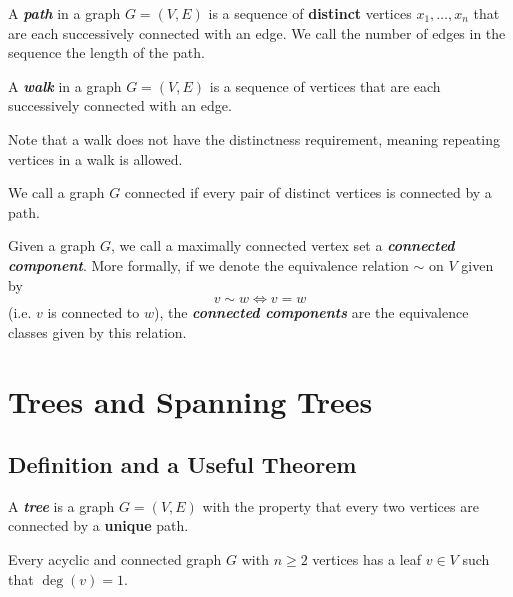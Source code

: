 \begin{definition}[Path]
    A \textit{\textbf{path}} in a graph $G = (V,E)$ is a sequence of \textbf{distinct} vertices $x_1,\ldots,x_n$ that are each successively connected with an edge. We call the number of edges in the sequence the length of the path.
\end{definition}

\begin{definition}[Walk]
    A \textit{\textbf{walk}} in a graph $G = (V,E)$ is a sequence of vertices that are each successively connected with an edge.
\end{definition}

Note that a walk does not have the distinctness requirement, meaning repeating vertices in a walk is allowed.

\begin{definition}[Connectivity]
    We call a graph $G$ connected if every pair of distinct vertices is connected by a path.
\end{definition}

\begin{definition}
    Given a graph $G$, we call a maximally connected vertex set a \textit{\textbf{connected component}}. More formally, if we denote the equivalence relation $\sim$ on $V$ given by
    $$
    v \sim w \iff v = w
    $$
    (i.e. $v$ is connected to $w$), the \textit{\textbf{connected components}} are the equivalence classes given by this relation.
\end{definition}

\section{Trees and Spanning Trees}

\subsection{Definition and a Useful Theorem}

\begin{definition}[Tree]
    A \textit{\textbf{tree}} is a graph $G = (V,E)$ with the property that every two vertices are connected by a \textbf{unique} path.
\end{definition}

\begin{lemma} \label{lem:acyclic-graph-degree}
    Every acyclic and connected graph $G$ with $n \geq 2$ vertices has a leaf $v \in V$ such that $\deg(v) = 1$.
\end{lemma}

